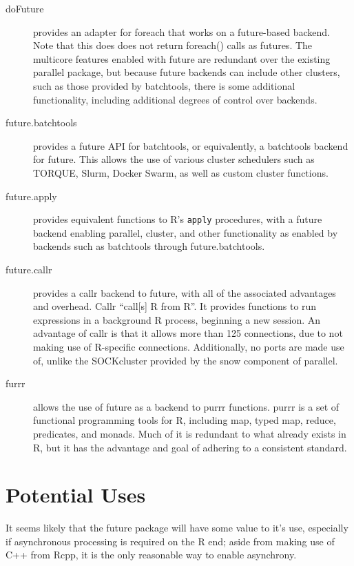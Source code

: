 \documentclass[10pt,a4paper]{article}
\begin{document}
\begin{description}
\item[doFuture]\cite{bengtsson20do} provides an adapter for
  foreach\cite{microsoft20} that works on a future-based backend. Note
  that this does does not return foreach() calls as futures. The
  multicore features enabled with future are redundant over the
  existing parallel package, but because future backends can include
  other clusters, such as those provided by batchtools, there is some
  additional functionality, including additional degrees of control
  over backends.
\item[future.batchtools]\cite{bengtsson19batch} provides a future API
  for batchtools\cite{lang17}, or equivalently, a batchtools backend
  for future. This allows the use of various cluster schedulers such
  as TORQUE, Slurm, Docker Swarm, as well as custom cluster functions.
\item[future.apply]\cite{bengtsson20apply} provides equivalent
  functions to R's \texttt{apply} procedures, with a future backend
  enabling parallel, cluster, and other functionality as enabled by
  backends such as batchtools through future.batchtools.
\item[future.callr]\cite{bengtsson19callr} provides a
  callr\cite{csárdi20} backend to future, with all of the associated
  advantages and overhead. Callr \enquote{call[s] R from R}. It
  provides functions to run expressions in a background R process,
  beginning a new session. An advantage of callr is that it allows
  more than 125 connections, due to not making use of R-specific
  connections. Additionally, no ports are made use of, unlike the
  SOCKcluster provided by the snow component of parallel.
\item[furrr]\cite{vaughan18} allows the use of future as a backend to
  purrr functions. purrr is a set of functional programming tools for
  R, including map, typed map, reduce, predicates, and monads. Much of
  it is redundant to what already exists in R, but it has the
  advantage and goal of adhering to a consistent standard.
\end{description}

\section{Potential Uses}
\label{sec:potential-uses}

It seems likely that the future package will have some value to it's
use, especially if asynchronous processing is required on the R end;
aside from making use of C++ from Rcpp, it is the only reasonable way
to enable asynchrony.

\printbibliography{}
\end{document}
